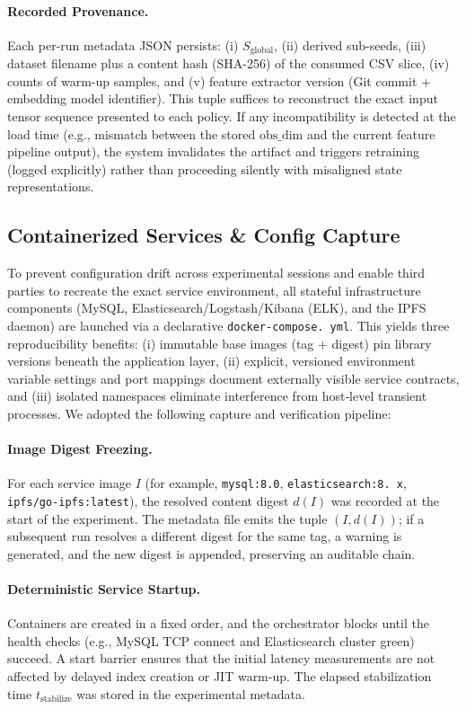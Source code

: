 \paragraph{Recorded Provenance.} Each per-run metadata JSON persists: (i) $S_{\text{global}}$, (ii) derived sub-seeds, (iii) dataset filename plus a content hash (SHA-256) of the consumed CSV slice, (iv) counts of warm-up samples, and (v) feature extractor version (Git commit + embedding model identifier). This tuple suffices to reconstruct the exact input tensor sequence presented to each policy. If any incompatibility is detected at the load time (e.g., mismatch between the stored $\text{obs\_dim}$ and the current feature pipeline output), the system invalidates the artifact and triggers retraining (logged explicitly) rather than proceeding silently with misaligned state representations.
\subsection{Containerized Services \& Config Capture}
\label{subsec:containerization_config_capture}
To prevent configuration drift across experimental sessions and enable third parties to recreate the exact service environment, all stateful infrastructure components (MySQL, Elasticsearch/Logstash/Kibana (ELK), and the IPFS daemon) are launched via a declarative \texttt{docker-compose. yml}. This yields three reproducibility benefits: (i) immutable base images (tag + digest) pin library versions beneath the application layer, (ii) explicit, versioned environment variable settings and port mappings document externally visible service contracts, and (iii) isolated namespaces eliminate interference from host‐level transient processes. We adopted the following capture and verification pipeline:

\paragraph{Image Digest Freezing.} For each service image $I$ (for example, \texttt{mysql:8.0}, \texttt{elasticsearch:8. x}, \texttt{ipfs/go-ipfs:latest}), the resolved content digest $d(I)$ was recorded at the start of the experiment. The metadata file emits the tuple $(I, d(I))$; if a subsequent run resolves a different digest for the same tag, a warning is generated, and the new digest is appended, preserving an auditable chain.

\paragraph{Deterministic Service Startup.} Containers are created in a fixed order, and the orchestrator blocks until the health checks (e.g., MySQL TCP connect and Elasticsearch cluster green) succeed. A start barrier ensures that the initial latency measurements are not affected by delayed index creation or JIT warm-up. The elapsed stabilization time $t_{\text{stabilize}}$ was stored in the experimental metadata.

